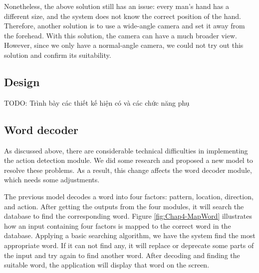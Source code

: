 Nonetheless, the above solution still has an issue: every man's hand has a different size, and the system does not know the correct position of the hand. Therefore, another solution is to use a wide-angle camera and set it away from the forehead. With this solution, the camera can have a much broader view. However, since we only have a normal-angle camera, we could not try out this solution and confirm its suitability.

\subsection{Design}
TODO: Trình bày các thiết kế hiện có và các chức năng phụ

\subsection{Word decoder}













As discussed above, there are considerable technical difficulties in implementing the action detection module. We did some research and proposed a new model to resolve these problems. As a result, this change affects the word decoder module, which needs some adjustments.

The previous model decodes a word into four factors: pattern, location, direction, and action. After getting the outputs from the four modules, it will search the database to find the corresponding word. Figure \ref{fig:Chap4-MapWord} illustrates how an input containing four factors is mapped to the correct word in the database. Applying a basic searching algorithm, we have the system find the most appropriate word. If it can not find any, it will replace or deprecate some parts of the input and try again to find another word. After decoding and finding the suitable word, the application will display that word on the screen.

